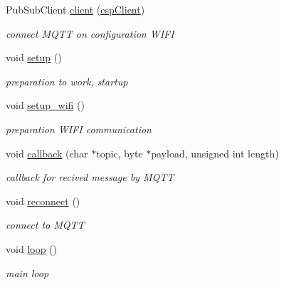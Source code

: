 \begin{DoxyCompactItemize}
\item 
\mbox{\label{_e_s_p_8ino_aee63e84c606cfaefce454689113c636c}} 
Pub\+Sub\+Client \hyperlink{_e_s_p_8ino_aee63e84c606cfaefce454689113c636c}{client} (\hyperlink{_e_s_p_8ino_abd77e757e4b3bb6f1e4b42b21ea9e040}{esp\+Client})
\begin{DoxyCompactList}\small\item\em connect M\+Q\+TT on configuration W\+I\+FI \end{DoxyCompactList}\item 
\mbox{\label{_e_s_p_8ino_a4fc01d736fe50cf5b977f755b675f11d}} 
void \hyperlink{_e_s_p_8ino_a4fc01d736fe50cf5b977f755b675f11d}{setup} ()
\begin{DoxyCompactList}\small\item\em preparation to work, startup \end{DoxyCompactList}\item 
\mbox{\label{_e_s_p_8ino_ae5b88d967e3185d98053cf055c8b4f1f}} 
void \hyperlink{_e_s_p_8ino_ae5b88d967e3185d98053cf055c8b4f1f}{setup\+\_\+wifi} ()
\begin{DoxyCompactList}\small\item\em preparation W\+I\+FI communication \end{DoxyCompactList}\item 
void \hyperlink{_e_s_p_8ino_ac3a129f66dc859e2b7279565f4e1de78}{callback} (char $\ast$topic, byte $\ast$payload, unsigned int length)
\begin{DoxyCompactList}\small\item\em callback for recived message by M\+Q\+TT \end{DoxyCompactList}\item 
\mbox{\label{_e_s_p_8ino_a4bcd6ce7d04c38f8c4ff908d1fc50f86}} 
void \hyperlink{_e_s_p_8ino_a4bcd6ce7d04c38f8c4ff908d1fc50f86}{reconnect} ()
\begin{DoxyCompactList}\small\item\em connect to M\+Q\+TT \end{DoxyCompactList}\item 
\mbox{\label{_e_s_p_8ino_afe461d27b9c48d5921c00d521181f12f}} 
void \hyperlink{_e_s_p_8ino_afe461d27b9c48d5921c00d521181f12f}{loop} ()
\begin{DoxyCompactList}\small\item\em main loop \end{DoxyCompactList}\end{DoxyCompactItemize}
